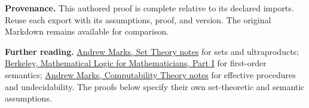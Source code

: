 \documentclass[preprint,12pt,aps,pra,showkeys,amsmath,amssymb,superscriptaddress,floatfix]{revtex4-2}
\theoremstyle{definition}
\theoremstyle{remark}
\begin{document}
\par\medskip\begingroup\small\linespread{1.0}\selectfont\noindent\textbf{Provenance.} This authored proof is complete relative to its declared imports. Reuse
each export with its assumptions, proof, and version. The original
Markdown remains available for comparison.
\par\endgroup

\par\smallskip\begingroup\small\linespread{1.0}\selectfont\noindent\textbf{Further reading.} \href{https://math.berkeley.edu/~marks/notes/set_theory_notes_4.pdf}{Andrew
Marks, Set Theory notes} for sets and ultraproducts;
\href{https://math.berkeley.edu/~antonio/math125A/mathlogicP1.pdf}{Berkeley,
Mathematical Logic for Mathematicians, Part I} for first-order
semantics;
\href{https://math.berkeley.edu/~marks/notes/computability_notes_v1.pdf}{Andrew
Marks, Computability Theory notes} for effective procedures and
undecidability. The proofs below specify their own set-theoretic and
semantic assumptions.\par\endgroup
\end{document}
